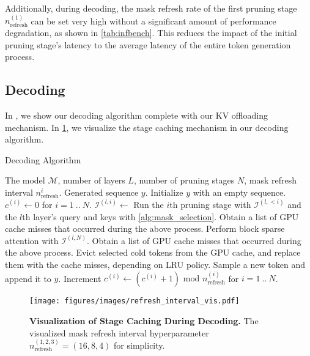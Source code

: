 Additionally, during decoding, the mask refresh rate of the first pruning stage $n_\text{refresh}^{(1)}$ can be set very high without a significant amount of performance degradation, as shown in \cref{tab:infbench}. This reduces the impact of the initial pruning stage's latency to the average latency of the entire token generation process.


\subsection{Decoding}
In , we show our decoding algorithm complete with our KV offloading mechanism. In \cref{fig:refresh_interval_visualization}, we visualize the stage caching mechanism in our decoding algorithm.

\begin{algorithm}[H]
\caption{\ours Decoding Algorithm}\label{alg:decoding}
\begin{algorithmic}[1]
\INPUT The model $\mathcal{M}$, number of layers $L$, number of pruning stages $N$, mask refresh interval $n_\text{refresh}^i$.
\OUTPUT Generated sequence $y$.
\STATE Initialize $y$ with an empty sequence.
\STATE $c^{(i)} \leftarrow 0$ for $i = 1~..~N$.
            \STATE $\mathcal{I}^{(l, i)} \leftarrow$ Run the $i$th pruning stage with $\mathcal{I}^{(l, <i)}$ and  the $l$th layer's query and keys with \cref{alg:mask_selection}.
            \STATE Obtain a list of GPU cache misses that occurred during the above process.
        \ENDIF
    \ENDFOR
    \STATE Perform block sparse attention with $\mathcal{I}^{(l, N)}$.
    \STATE Obtain a list of GPU cache misses that occurred during the above process.
    \STATE Evict selected cold tokens from the GPU cache, and replace them with the cache misses, depending on LRU policy.
\ENDFOR
\STATE Sample a new token and append it to $y$.
\STATE Increment $c^{(i)} \leftarrow (c^{(i)} + 1) \text{ mod } n_\text{refresh}^{(i)}$ for $i = 1~..~N$.
\ENDWHILE
\end{algorithmic}
\end{algorithm}

\begin{figure}[h]
\centering
\texttt{[image: figures/images/refresh\_interval\_vis.pdf]}
\caption{\textbf{Visualization of Stage Caching During Decoding.} The visualized mask refresh interval hyperparameter $n_{\text{refresh}}^{(1,2,3)}=(16,8,4)$ for simplicity.}
\label{fig:refresh_interval_visualization}
\end{figure}

